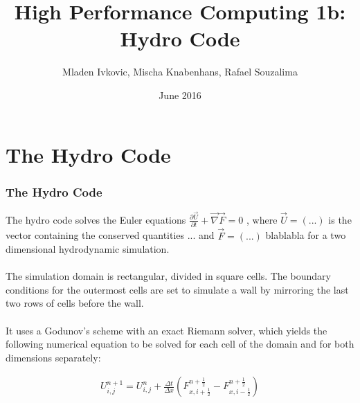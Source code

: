 \documentclass[8pt]{beamer}
\title{High Performance Computing 1b: Hydro Code}
\author{
	Mladen Ivkovic, Mischa Knabenhans, Rafael Souzalima
}
\date{June 2016}
\begin{document}
% 
% 
% 
% 
% 


\begin{frame}{}
	\titlepage
\end{frame}

\section{The Hydro Code}
\begin{frame}
	\frametitle{The Hydro Code}
	
	The hydro code solves the Euler equations $\displaystyle \frac{\partial \vec{U}}{\partial t} + \vec{\nabla} \vec{F} = 0 $ , where $\vec{U} = (...) $ is the vector containing the conserved quantities ... and $\vec{F} = (...)$  blablabla for a two dimensional hydrodynamic simulation. \\~\\
	
	The simulation domain is rectangular, divided in square cells. The boundary conditions for the outermost cells are set to simulate a wall by mirroring the last two rows of cells before the wall. \\~\\
	
	It uses a Godunov's scheme with an exact Riemann solver, which yields the following numerical equation to be solved for each cell of the domain and for both dimensions separately:
	
	\begin{align*}
		U^{n+1}_{i,j} = U^n_{i,j} + \frac{\Delta t}{\Delta x} \left( F^{n + \frac{1}{2}}_{x, i + \frac{1}{2}} -  F^{n + \frac{1}{2}}_{x, i - \frac{1}{2}}\right)
	\end{align*}
\end{frame}
\end{document}

